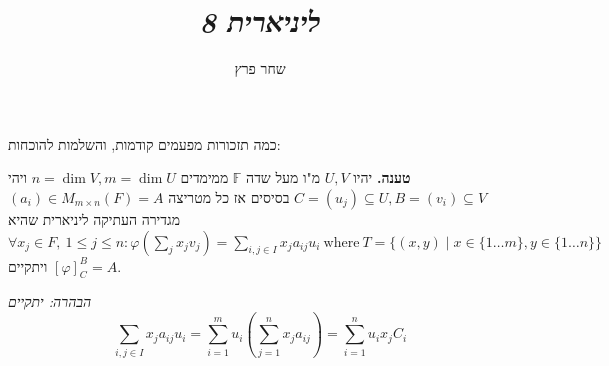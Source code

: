 \documentclass[]{article}
\author{שחר פרץ}
\title{\textit{ליניארית 8}}
\newcommand\F         {\mathbb{F}}
\newcommand\co        {\colon}
\newcommand\cl [1]    {\left ( #1 \right )}
\renewcommand\phi     {\varphi}
\begin{document}
	\maketitle
	כמה תזכורות מפעמים קודמות, והשלמות להוכחות: 
	
	\textbf{טענה. }יהיו $U, V$ מ"ו מעל שדה $\F$ ממימדים $n = \dim V, m = \dim U$ ויהי $C = (u_j) \subseteq U, B = (v_i) \subseteq V$ בסיסים אז כל מטריצה $(a_i) \in M_{m \times n}(F) = A$ מגדירה העתיקה ליניארית שהיא $\forall x_j \in F, \ 1 \le j \le n\co \phi(\sum_j x_j v_j) = \sum_{i, j \in I}x_ja_{ij}u_i \ \mathrm{where} \ T = \{(x, y) \mid x \in \{1 \dots m\}, y \in \{1 \dots n\}\}$ ויתקיים $[\phi]_C^B = A$. 
	
	\textit{הבהרה: יתקיים}
	\[ \sum_{i, j \in I}x_ja_{ij}u_i = \sum^m_{i = 1} u_i \cl{\sum_{j = 1}^{n} x_ja_{ij}} = \sum_{i = 1}^n u_i x_j C_i \]
	
\end{document}
